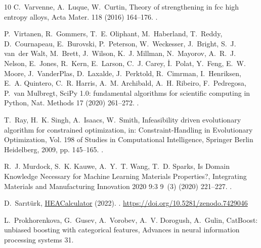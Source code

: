 \documentclass[preprint,12pt,times]{elsarticle}  %
\providecommand{\JournalTitle}[1]{#1}
\begin{document}
\begin{thebibliography}{10}
C.~Varvenne, A.~Luque, W.~Curtin, Theory of strengthening in fcc high entropy
  alloys, {\JournalTitle{Acta Mater.}} 118 (2016) 164--176.
\newblock \href {http://dx.doi.org/10.1016/j.actamat.2016.07.040}
  {}.

P.~Virtanen, R.~Gommers, T.~E. Oliphant, M.~Haberland, T.~Reddy, D.~Cournapeau,
  E.~Burovski, P.~Peterson, W.~Weckesser, J.~Bright, S.~J. van~der Walt,
  M.~Brett, J.~Wilson, K.~J. Millman, N.~Mayorov, A.~R.~J. Nelson, E.~Jones,
  R.~Kern, E.~Larson, C.~J. Carey, {\.I}.~Polat, Y.~Feng, E.~W. Moore,
  J.~VanderPlas, D.~Laxalde, J.~Perktold, R.~Cimrman, I.~Henriksen, E.~A.
  Quintero, C.~R. Harris, A.~M. Archibald, A.~H. Ribeiro, F.~Pedregosa, P.~van
  Mulbregt, {SciPy} 1.0: fundamental algorithms for scientific computing in
  {Python}, {\JournalTitle{Nat. Methods}} 17 (2020) 261--272.
\newblock \href {http://dx.doi.org/10.1038/s41592-019-0686-2}
  {}.

T.~Ray, H.~K. Singh, A.~Isaacs, W.~Smith, Infeasibility driven evolutionary
  algorithm for constrained optimization, in: Constraint-Handling in
  Evolutionary Optimization, Vol. 198 of Studies in Computational Intelligence,
  Springer Berlin Heidelberg, 2009, pp. 145--165.
\newblock \href {http://dx.doi.org/10.1007/978-3-642-00619-7_7}
  {}.

R.~J. Murdock, S.~K. Kauwe, A.~Y.~T. Wang, T.~D. Sparks, {Is Domain Knowledge
  Necessary for Machine Learning Materials Properties?},
  {\JournalTitle{Integrating Materials and Manufacturing Innovation 2020 9:3}}
  9~(3) (2020) 221--227.
\newblock \href {http://dx.doi.org/10.1007/S40192-020-00179-Z}
  {}.

D.~Sarıt{\"{u}}rk,
  \href{https://doi.org/10.5281/zenodo.7429046}{{HEACalculator}} (2022).
\newblock \href {http://dx.doi.org/10.5281/zenodo.7429046}
  {}.
\newline\urlprefix\url{https://doi.org/10.5281/zenodo.7429046}

L.~Prokhorenkova, G.~Gusev, A.~Vorobev, A.~V. Dorogush, A.~Gulin, {CatBoost:
  unbiased boosting with categorical features}, {\JournalTitle{Advances in
  neural information processing systems}} 31.


\end{thebibliography}
\end{document}
